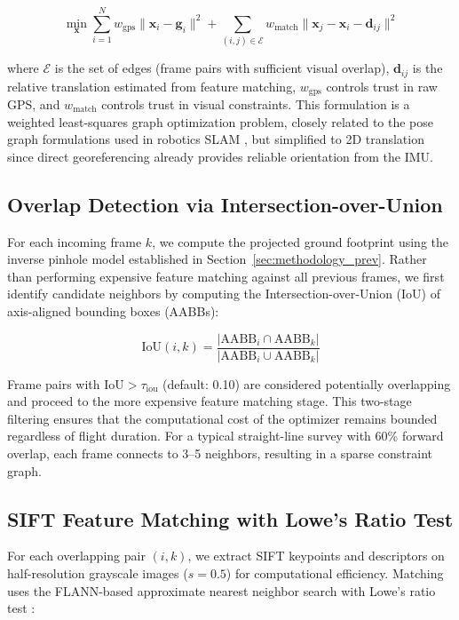 \documentclass[conference]{IEEEtran}
\begin{document}
\begin{equation}
\min_{\mathbf{x}} \sum_{i=1}^{N} w_{\text{gps}} \|\mathbf{x}_i - \mathbf{g}_i\|^2 + \sum_{(i,j) \in \mathcal{E}} w_{\text{match}} \|\mathbf{x}_j - \mathbf{x}_i - \mathbf{d}_{ij}\|^2
\label{eq:posegraph}
\end{equation}

where $\mathcal{E}$ is the set of edges (frame pairs with sufficient visual overlap), $\mathbf{d}_{ij}$ is the relative translation estimated from feature matching, $w_{\text{gps}}$ controls trust in raw GPS, and $w_{\text{match}}$ controls trust in visual constraints. This formulation is a weighted least-squares graph optimization problem, closely related to the pose graph formulations used in robotics SLAM \cite{kummerle2011}, but simplified to 2D translation since direct georeferencing already provides reliable orientation from the IMU.

\subsection{Overlap Detection via Intersection-over-Union}

For each incoming frame $k$, we compute the projected ground footprint using the inverse pinhole model established in Section~\ref{sec:methodology_prev}. Rather than performing expensive feature matching against all previous frames, we first identify candidate neighbors by computing the Intersection-over-Union (IoU) of axis-aligned bounding boxes (AABBs):

\begin{equation}
\text{IoU}(i, k) = \frac{|\text{AABB}_i \cap \text{AABB}_k|}{|\text{AABB}_i \cup \text{AABB}_k|}
\end{equation}

Frame pairs with $\text{IoU} > \tau_{\text{iou}}$ (default: 0.10) are considered potentially overlapping and proceed to the more expensive feature matching stage. This two-stage filtering ensures that the computational cost of the optimizer remains bounded regardless of flight duration. For a typical straight-line survey with 60\% forward overlap, each frame connects to 3--5 neighbors, resulting in a sparse constraint graph.

\subsection{SIFT Feature Matching with Lowe's Ratio Test}

For each overlapping pair $(i, k)$, we extract SIFT keypoints and descriptors on half-resolution grayscale images ($s = 0.5$) for computational efficiency. Matching uses the FLANN-based approximate nearest neighbor search with Lowe's ratio test \cite{brown2007autostitch}:
\end{document}
